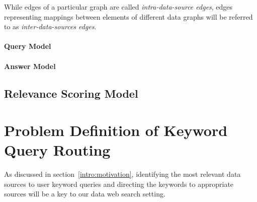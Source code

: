 While edges of a particular graph are called
\emph{intra-data-source edges}, edges representing mappings
between elements of different data graphs will be referred to as
\emph{inter-data-sources edges}.

\paragraph{Query Model}

\paragraph{Answer Model}

\subsection{Relevance Scoring Model}


\section{Problem Definition of Keyword Query Routing}\label{pre:routing}

As discussed in section~\ref{intro:motivation}, identifying the most relevant data sources to user
keyword queries and directing the keywords to appropriate sources will be a key to our data web
search setting.



